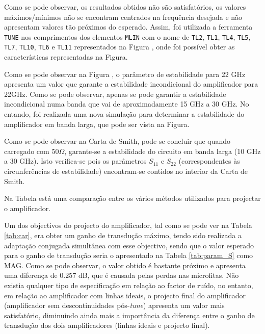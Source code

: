 \documentclass[11pt]{article}
\numberwithin{equation}{section}
\begin{document}
Como se pode observar, os resultados obtidos não são satisfatórios, os valores máximos/mínimos não se encontram centrados na frequência desejada e não apresentam valores tão próximos do esperado. Assim, foi utilizada a ferramenta \texttt{TUNE} nos comprimentos dos elementos \texttt{MLIN} com o nome de \texttt{TL2}, \texttt{TL1}, \texttt{TL4}, \texttt{TL5}, \texttt{TL7}, \texttt{TL10}, \texttt{TL6} e \texttt{TL11} representados na Figura , onde foi possível obter as características representadas na Figura.


Como se pode observar na Figura , o parâmetro de estabilidade para 22 GHz apresenta um valor que garante a estabilidade incondicional do amplificador para 22GHz. Como se pode observar, apenas se pode garantir a estabilidade incondicional numa banda que vai de aproximadamente 15 GHz a 30 GHz. No entando, foi realizada uma nova simulação para determinar a estabilidade do amplificador em banda larga, que pode ser vista na Figura. 

Como se pode observar na Carta de Smith, pode-se concluir que quando carregado com 50$\Omega$, garante-se a estabilidade do circuito em banda larga (10 GHz a 30 GHz). Isto verifica-se pois os parâmetros $S_{11}$ e $S_{22}$ (correspondentes às circunferências de estabilidade) encontram-se contidos no interior da Carta de Smith.


Na Tabela  está uma comparação entre os vários métodos utilizados para projectar o amplificador.


Um dos objectivos do projecto do amplificador, tal como se pode ver na Tabela \ref{tab:car}, era obter um ganho de transdução máximo, tendo sido realizada a adaptação conjugada simultânea com esse objectivo, sendo que o valor esperado para o ganho de transdução seria o apresentado na Tabela \ref{tab:param_S} como MAG. Como se pode observar, o valor obtido é bastante próximo e apresenta uma diferença de $0.257$ dB, que é causada pelas perdas nas microfitas. Não existia qualquer tipo de especificação em relação ao factor de ruído, no entanto, em relação ao amplificador com linhas ideais, o projecto final do amplificador (amplificador sem descontinuidades pós-\textit{tune}) apresenta um valor mais satisfatório, diminuindo ainda mais a importância da diferença entre o ganho de transdução dos dois amplificadores (linhas ideais e projecto final).
\end{document}
